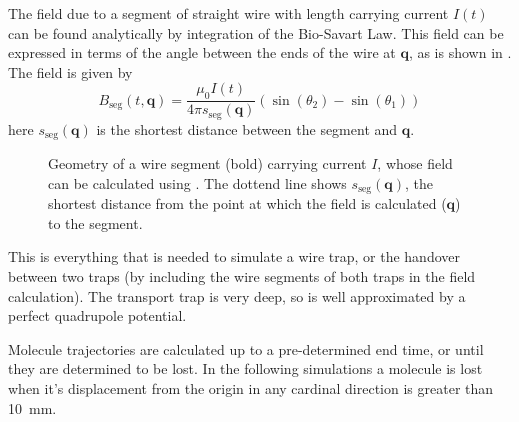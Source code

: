 The field due to a segment of straight wire with length carrying current $I(t)$
can be found analytically by integration of the Bio-Savart Law.
This field can be expressed in terms of the angle between the ends of the wire
at $\mathbf{q}$, as is shown in . The field
is given by~\cite{Griffiths2017}
%
\begin{equation}
  B_\text{seg}(t, \mathbf{q}) = \frac{\mu_0 I(t)}{4\pi
  s_\text{seg}(\mathbf{q})} (\sin(\theta_2)  - \sin(\theta_1))
\label{design:eq:segmentfield}
\end{equation}
here $s_\text{seg}(\mathbf{q})$ is the shortest distance between the segment
and $\mathbf{q}$.

\begin{figure}[h]
\centering
  \caption{Geometry of a wire segment (bold) carrying current $I$, whose field
  can be calculated using . The dottend line
  shows $s_\text{seg}(\mathbf{q})$, the shortest distance from the point at
  which the field is calculated ($\mathbf{q}$) to the segment.
  }
  \label{design:fig:wiresegment}
\end{figure}

This is everything that is needed to simulate a wire trap, or the handover
between two traps (by including the wire segments of both traps in the field
calculation). The transport trap is very deep, so is well approximated by a
perfect quadrupole potential.

Molecule trajectories are calculated up to a pre-determined end time, or until
they are determined to be lost. In the following simulations a molecule is lost
when it's displacement from the origin in any cardinal direction is greater
than \SI{10}{\milli\meter}.

